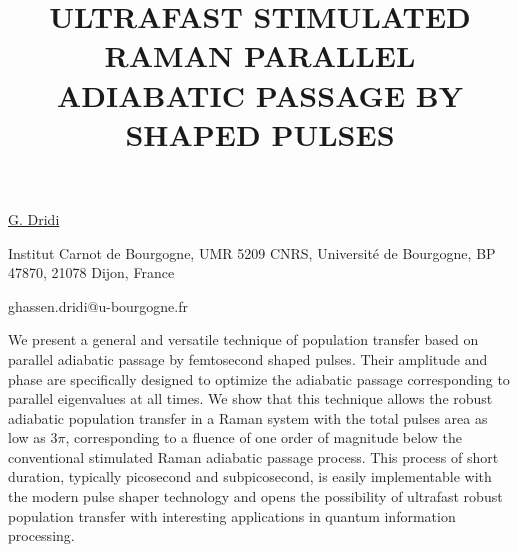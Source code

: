 \title{ULTRAFAST STIMULATED RAMAN PARALLEL ADIABATIC PASSAGE BY SHAPED PULSES}

\underline{G. Dridi} 

\vspace{-4mm}
{\normalsize{
Institut Carnot de Bourgogne, UMR 5209 CNRS, Universit\'e de Bourgogne, BP 47870, 21078 Dijon, France

\email ghassen.dridi@u-bourgogne.fr}}

We present a general and versatile technique of population transfer based on parallel adiabatic passage by femtosecond shaped pulses. Their amplitude and phase are specifically designed to optimize the adiabatic passage corresponding to parallel eigenvalues at all times. We show that this technique allows the robust adiabatic population transfer in a Raman system with the total pulses area as low as $3\pi$, corresponding to a fluence of one order of magnitude below the conventional stimulated Raman adiabatic passage process. This process of short duration, typically picosecond and subpicosecond, is easily implementable with the modern pulse shaper technology and opens the possibility of ultrafast robust population transfer with interesting applications in quantum information processing.

\vspace{\baselineskip} 